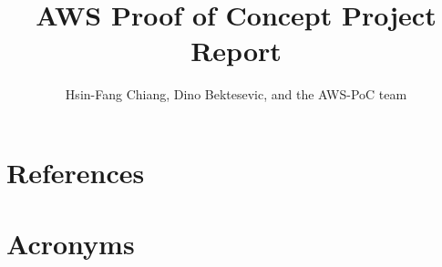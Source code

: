 \documentclass[DM,authoryear,toc]{lsstdoc}
\title{AWS Proof of Concept Project Report}
\author{
Hsin-Fang Chiang, Dino Bektesevic, and the AWS-PoC team
}
\date{\vcsDate}
\begin{document}
\mkshorttitle



\appendix
%
\section{References} \label{sec:bib}


\section{Acronyms} \label{sec:acronyms}
%
\end{document}
